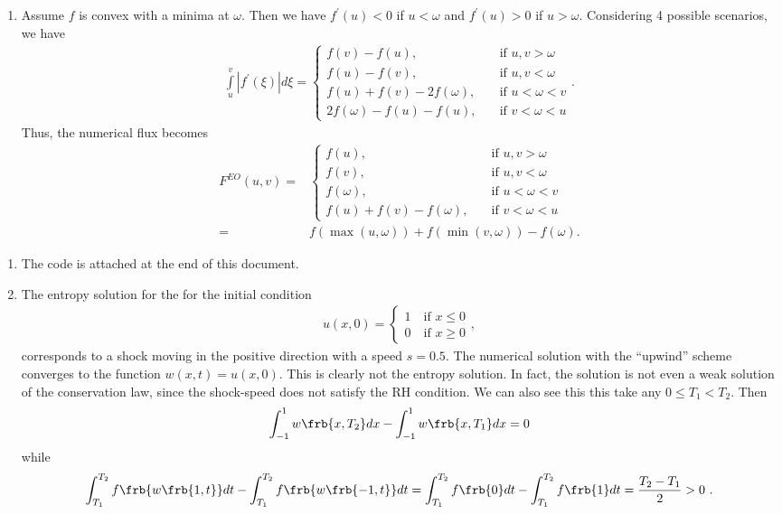 \documentclass{article}
\begin{document}
\begin{exerciseList}
\begin{enumerate}
\item Assume $f$ is convex with a minima at $\omega$. Then we have $f^\prime(u) < 0$ if $u < \omega$ and $f^\prime(u) > 0$ if $u > \omega$. Considering 4 possible scenarios, we have
\begin{gather}
\int \limits_u^v |f^\prime(\xi) | d \xi = \begin{cases}
f(v) - f(u), & \quad \text{if } u,v > \omega\\
f(u) - f(v), & \quad \text{if } u,v < \omega\\
f(u) + f(v) - 2f(\omega), & \quad \text{if } u < \omega < v \\
2 f(\omega) - f(u) - f(u), & \quad \text{if } v < \omega < u
\end{cases}.
\end{gather}
Thus, the numerical flux becomes 
\begin{gather}
F^{EO}(u,v) =& \begin{cases}
f(u), & \quad \text{if } u,v > \omega\\
f(v), & \quad \text{if } u,v < \omega\\
f(\omega), & \quad \text{if } u < \omega < v \\
f(u) + f(v) - f(\omega), & \quad \text{if } v < \omega < u
\end{cases}\\
=& f(\max(u,\omega)) + f(\min(v,\omega)) - f(\omega).
\end{gather}

\end{enumerate}


\item
\begin{enumerate}

\item The code is attached at the end of this document.
\item The entropy solution for the for the initial condition
\begin{gather}
u(x,0) = \begin{cases} 1 \quad \text{if } x\leq 0 \\0 \quad \text{if } x\geq 0 \end{cases},
\end{gather}
corresponds to a shock moving in the positive direction with a speed $s=0.5$.
The numerical solution with the ``upwind'' scheme converges to the function $w(x,t)=u(x,0)$. This is clearly not the entropy solution. In fact, the solution is not even a weak solution of the conservation law, since the shock-speed does not satisfy the RH condition. We can also see this
this take any $0\leq T_{1}<T_{2}$. Then 
\begin{gather}
	\int_{-1}^{1}w\frb{x,T_{2}}dx-\int_{-1}^{1}w\frb{x,T_{1}}dx=0
\end{gather}
while
\begin{gather}
	\int_{T_{1}}^{T_{2}}f\frb{w\frb{1,t}}dt -\int_{T_{1}}^{T_{2}}f\frb{w\frb{-1,t}}dt
		=\int_{T_{1}}^{T_{2}}f\frb{0}dt-\int_{T_{1}}^{T_{2}}f\frb{1}dt
		=\frac{T_{2}-T_{1}}{2}>0\ .
\end{gather}


\end{enumerate}
\end{exerciseList}
\end{document}
